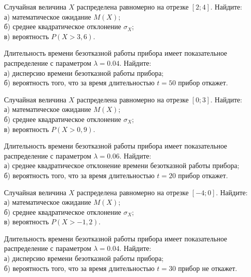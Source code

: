 \vfill

\newpage\setcounter{zad}{0}

\z Случайная величина $X$ распределена равномерно на отрезке $[2; 4]$. Найдите: \\ \quad а) математическое ожидание $M(X)$; \\ \quad б) среднее квадратическое отклонение $\sigma_X$; \\ \quad в) вероятность $P(X>3{,}6)$.


\vfill

\z Длительность времени безотказной работы прибора имеет показательное распределение с параметром $\lambda = 0.04$. Найдите: \\ \quad а) дисперсию времени безотказной работы прибора; \\ \quad б) вероятность того, что за время длительностью $t = 50$ прибор откажет.
 

\vfill

\newpage\setcounter{zad}{0}

\z Случайная величина $X$ распределена равномерно на отрезке $[0; 3]$. Найдите: \\ \quad а) математическое ожидание $M(X)$; \\ \quad б) среднее квадратическое отклонение $\sigma_X$; \\ \quad в) вероятность $P(X>0{,}9)$.


\vfill

\z Длительность времени безотказной работы прибора имеет показательное распределение с параметром $\lambda = 0.06$. Найдите: \\ \quad а) среднее квадратическое отклонение времени безотказной работы прибора; \\ \quad б) вероятность того, что за время длительностью $t = 20$ прибор откажет.
 

\vfill

\newpage\setcounter{zad}{0}

\z Случайная величина $X$ распределена равномерно на отрезке $[-4; 0]$. Найдите: \\ \quad а) математическое ожидание $M(X)$; \\ \quad б) среднее квадратическое отклонение $\sigma_X$; \\ \quad в) вероятность $P(X>-1{,}2)$.


\vfill

\z Длительность времени безотказной работы прибора имеет показательное распределение с параметром $\lambda = 0.04$. Найдите: \\ \quad а) дисперсию времени безотказной работы прибора; \\ \quad б) вероятность того, что за время длительностью $t = 30$ прибор не откажет.
 


